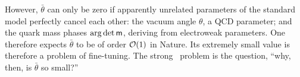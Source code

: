 However, $\bar θ$ can only be zero if apparently unrelated parameters of the standard model perfectly cancel each other: the vacuum angle $θ$, a QCD parameter; and the quark mass phases $\arg\det\mat m$, deriving from electroweak parameters.
One therefore expects $\bar θ$ to be of order $\cal O(1)$ in Nature.
Its extremely small value is therefore a problem of fine-tuning.
The strong \CP\ problem is the question, ``why, then, is $\bar θ$ so small?''


